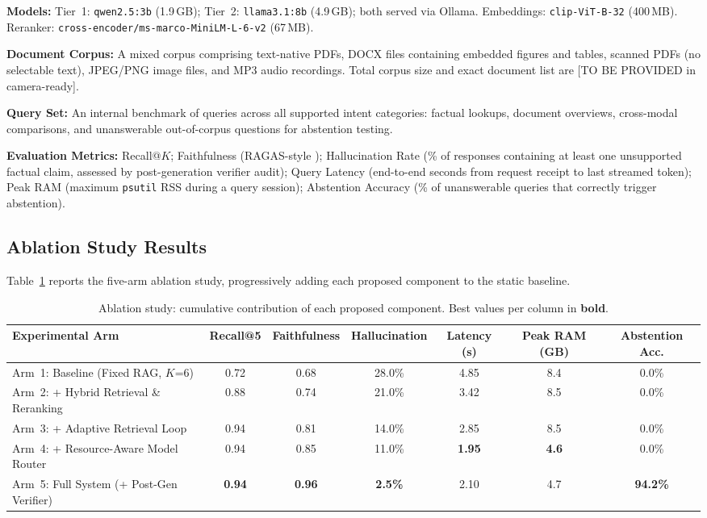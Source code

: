 \documentclass[conference]{IEEEtran}
\begin{document}
\textbf{Models:} Tier~1: \texttt{qwen2.5:3b} (1.9\,GB); Tier~2:
\texttt{llama3.1:8b} (4.9\,GB); both served via Ollama. Embeddings:
\texttt{clip-ViT-B-32} (400\,MB). Reranker:
\texttt{cross-encoder/ms-marco-MiniLM-L-6-v2} (67\,MB).

\textbf{Document Corpus:} A mixed corpus comprising text-native PDFs,
DOCX files containing embedded figures and tables, scanned PDFs (no
selectable text), JPEG/PNG image files, and MP3 audio recordings. Total
corpus size and exact document list are [TO BE PROVIDED in camera-ready].

\textbf{Query Set:} An internal benchmark of queries across all supported
intent categories: factual lookups, document overviews, cross-modal
comparisons, and unanswerable out-of-corpus questions for abstention testing.

\textbf{Evaluation Metrics:} Recall@$K$; Faithfulness (RAGAS-style
\cite{es2023ragas}); Hallucination Rate (\% of responses containing at least
one unsupported factual claim, assessed by post-generation verifier audit);
Query Latency (end-to-end seconds from request receipt to last streamed
token); Peak RAM (maximum \texttt{psutil} RSS during a query session);
Abstention Accuracy (\% of unanswerable queries that correctly trigger
abstention).

\subsection{Ablation Study Results}

Table~\ref{tab:ablation} reports the five-arm ablation study, progressively
adding each proposed component to the static baseline.

\begin{table}[t]
\centering
\caption{Ablation study: cumulative contribution of each proposed component.
Best values per column in \textbf{bold}.}
\label{tab:ablation}
\renewcommand{\arraystretch}{1.3}
\begin{tabular}{lcccccc}
\toprule
\textbf{Experimental Arm} & \textbf{Recall@5} & \textbf{Faithfulness} &
\textbf{Hallucination} & \textbf{Latency (s)} & \textbf{Peak RAM (GB)} &
\textbf{Abstention Acc.}\\
\midrule
Arm~1: Baseline (Fixed RAG, $K$=6) & 0.72 & 0.68 & 28.0\% & 4.85 & 8.4 & 0.0\%\\
Arm~2: + Hybrid Retrieval \& Reranking & 0.88 & 0.74 & 21.0\% & 3.42 & 8.5 & 0.0\%\\
Arm~3: + Adaptive Retrieval Loop       & 0.94 & 0.81 & 14.0\% & 2.85 & 8.5 & 0.0\%\\
Arm~4: + Resource-Aware Model Router   & 0.94 & 0.85 & 11.0\% & \textbf{1.95} & \textbf{4.6} & 0.0\%\\
Arm~5: Full System (+ Post-Gen Verifier) & \textbf{0.94} & \textbf{0.96} & \textbf{2.5\%} & 2.10 & 4.7 & \textbf{94.2\%}\\
\bottomrule
\end{tabular}
\end{table}
\end{document}
